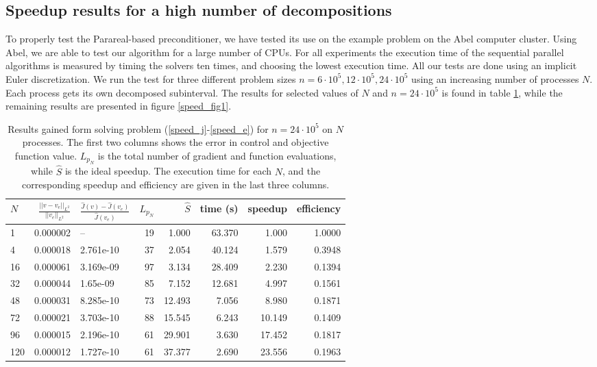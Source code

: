 \subsection{Speedup results for a high number of decompositions} \label{Aspeed_sec}
To properly test the Parareal-based preconditioner, we have tested its use on the example problem on the Abel computer cluster. Using Abel, we are able to test our algorithm for a large number of CPUs. For all experiments the execution time of the sequential parallel algorithms is measured by timing the solvers ten times, and choosing the lowest execution time. All our tests are done using an implicit Euler discretization. We run the test for three different problem sizes $n=6\cdot 10^5,12\cdot 10^5,24\cdot 10^5$ using an increasing number of processes $N$. Each process gets its own decomposed subinterval. The results for selected values of $N$ and $n= 24\cdot 10^5$ is found in table \ref{speed1}, while the remaining results are presented in figure \ref{speed_fig1}.
\\
\begin{table}[h]
\centering
\caption{Results gained form solving problem (\ref{speed_j}-\ref{speed_e}) for $n=24\cdot 10^5$ on $N$ processes. The first two columns shows the error in control and objective function value. $L_{p_N}$ is the total number of gradient and function evaluations, while $\hat S$ is the ideal speedup. The execution time for each $N$, and the corresponding speedup and efficiency are given in the last three columns.}
\label{speed1}
\begin{tabular}{lrlrrrrr}
\toprule
{}$N$ &   $\frac{||v-v_e||_{L^2}}{||v_e||_{L^2}}$ &     $\frac{\hat J(v)-\hat J(v_e)}{\hat{J}(v_e)}$ &   $L_{p_N}$ &     $\hat S$ &       time (s) &    speedup &        efficiency \\
\midrule
1   &  0.000002 &           -- &  19 &   1.000 &  63.370 &   1.000 &  1.0000 \\
4   &  0.000018 &  2.761e-10 &  37 &   2.054 &  40.124 &   1.579 &  0.3948 \\
16  &  0.000061 &  3.169e-09 &  97 &   3.134 &  28.409 &   2.230 &  0.1394 \\
32  &  0.000044 &   1.65e-09 &  85 &   7.152 &  12.681 &   4.997 &  0.1561 \\
48  &  0.000031 &  8.285e-10 &  73 &  12.493 &   7.056 &   8.980 &  0.1871 \\
72  &  0.000021 &  3.703e-10 &  88 &  15.545 &   6.243 &  10.149 &  0.1409 \\
96  &  0.000015 &  2.196e-10 &  61 &  29.901 &   3.630 &  17.452 &  0.1817 \\
120 &  0.000012 &  1.727e-10 &  61 &  37.377 &   2.690 &  23.556 &  0.1963 \\
\bottomrule
\end{tabular}
\end{table}
